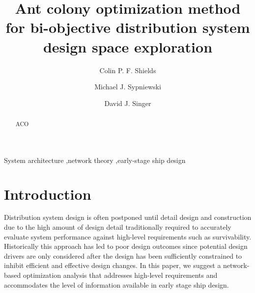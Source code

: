 \documentclass[preprint,12pt]{elsarticle}
\begin{document}
\begin{frontmatter}



\title{Ant colony optimization method for bi-objective distribution system design space exploration}


\author[1]{Colin P. F. Shields}
\author[1]{Michael J. Sypniewski} 
\author[1]{David J. Singer} 
\address[1]{University of Michigan, United States}

\begin{abstract}
ACO

\end{abstract}

\begin{keyword}


System architecture \sep network theory \sep early-stage ship design

\end{keyword}

\end{frontmatter}


\section{Introduction} \label{sec:intro}
Distribution system design is often postponed until detail design and construction due to the high amount of design detail traditionally required to accurately evaluate system performance against high-level requirements such as survivability.
Historically this approach has led to poor design outcomes since potential design drivers are only considered after the design has been sufficiently constrained to inhibit efficient and effective design changes.
In this paper, we suggest a network-based optimization analysis that addresses high-level requirements and accommodates the level of information available in early stage ship design.
\\
\end{document}
